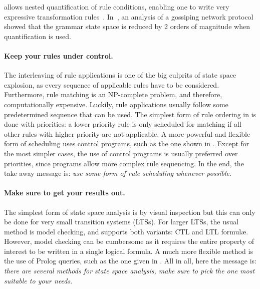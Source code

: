 \GROOVE allows nested quantification of rule conditions, enabling one to write
very expressive transformation rules~\cite{RK09}. In~\cite{Ren06b}, an analysis
of a gossiping network protocol showed that the grammar state space is reduced
by 2 orders of magnitude when quantification is used.

\vspace{-\medskipamount}
\paragraph{Keep your rules under control.} The interleaving of rule
applications is one of the big culprits of state space explosion, as every
sequence of applicable rules have to be considered. Furthermore, rule matching
is an NP-complete problem, and therefore, computationally expensive. Luckily,
rule applications usually follow some predetermined sequence that can be used.
The simplest form of rule ordering in \GROOVE is done with priorities: a lower
priority rule is only scheduled for matching if all other rules with higher
priority are not applicable. A more powerful and flexible form of scheduling
uses control programs, such as the one shown in . Except for the
most simpler cases, the use of control programs is usually preferred over
priorities, since programs allow more complex rule sequencing. In the end, the
take away message is: \emph{use some form of rule scheduling whenever possible}.

\vspace{-\medskipamount}
\paragraph{Make sure to get your results out.} The simplest form of state space
analysis is by visual inspection but this can only be done for very small
transition systems (LTSs). For larger LTSs, the usual method is model checking,
and \GROOVE supports both variants: CTL and LTL formul\ae. However, model
checking can be cumbersome as it requires the entire property of interest to be
written in a single logical formula. A much more flexible method is the use of
Prolog queries, such as the one given in . All in all, here the
message is: \emph{there are several methods for state space analysis, make
sure to pick the one most suitable to your needs}.
